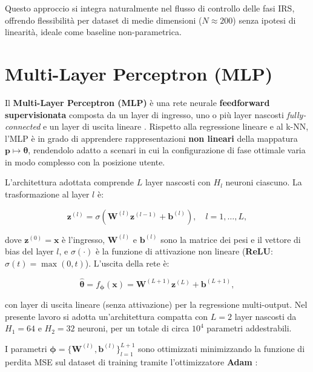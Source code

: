 \documentclass[12pt,a4paper]{report}
\begin{document}
Questo approccio si integra naturalmente nel flusso di controllo
delle fasi IRS, offrendo flessibilità per dataset di medie dimensioni
($N \approx 200$) senza ipotesi di linearità, ideale come baseline
non-parametrica.

\section{Multi-Layer Perceptron (MLP)}
Il \textbf{Multi-Layer Perceptron (MLP)} è una rete neurale
\textbf{feedforward supervisionata} composta da un layer di ingresso,
uno o più layer nascosti \emph{fully-connected} e un layer di uscita
lineare \cite{goodfellow2016dl}. Rispetto alla regressione lineare e
al k-NN, l'MLP è in grado di apprendere rappresentazioni \textbf{non
lineari} della mappatura $\mathbf{p} \mapsto \boldsymbol{\theta}$,
rendendolo adatto a scenari in cui la configurazione di fase ottimale
varia in modo complesso con la posizione utente.

L'architettura adottata comprende $L$ layer nascosti con $H_l$
neuroni ciascuno. La trasformazione al layer $l$ è:

\begin{equation}
  \mathbf{z}^{(l)} = \sigma\!\left(\mathbf{W}^{(l)}\mathbf{z}^{(l-1)}
  + \mathbf{b}^{(l)}\right), \quad l = 1, \dots, L,
  \label{eq:mlp_layer}
\end{equation}

dove $\mathbf{z}^{(0)} = \mathbf{x}$ è l'ingresso, $\mathbf{W}^{(l)}$
e $\mathbf{b}^{(l)}$ sono la matrice dei pesi e il vettore di bias
del layer $l$, e $\sigma(\cdot)$ è la funzione di attivazione non
lineare (\textbf{ReLU}: $\sigma(t) = \max(0, t)$). L'uscita della rete è:

\begin{equation}
  \hat{\boldsymbol{\theta}} = f_{\boldsymbol{\phi}}(\mathbf{x}) =
  \mathbf{W}^{(L+1)}\mathbf{z}^{(L)} + \mathbf{b}^{(L+1)},
  \label{eq:mlp_output}
\end{equation}

con layer di uscita lineare (senza attivazione) per la regressione
multi-output. Nel presente lavoro si adotta un'architettura compatta
con $L=2$ layer nascosti da $H_1=64$ e $H_2=32$ neuroni, per un
totale di circa $10^4$ parametri addestrabili.

\noindent I parametri $\boldsymbol{\phi} = \{\mathbf{W}^{(l)},
\mathbf{b}^{(l)}\}_{l=1}^{L+1}$ sono ottimizzati minimizzando la
funzione di perdita MSE sul dataset di training tramite
l'ottimizzatore \textbf{Adam} \cite{goodfellow2016dl}:
\end{document}
